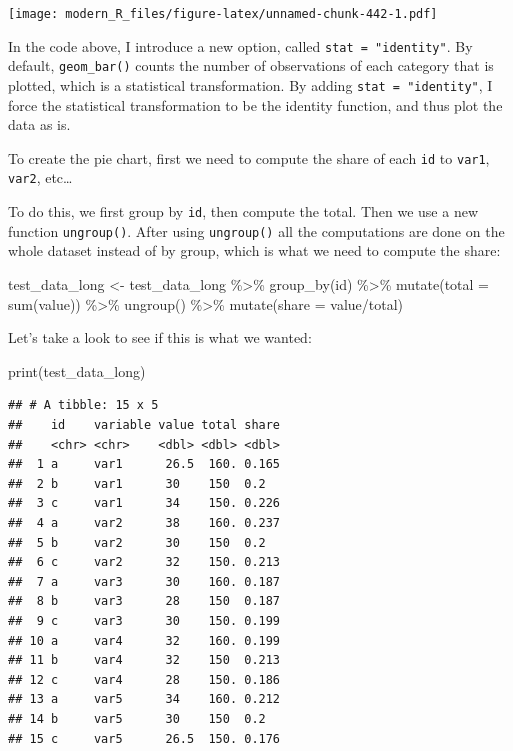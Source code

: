 \documentclass[
]{article}
\newenvironment{Shaded}{\begin{snugshade}}{\end{snugshade}}
\newcommand{\AttributeTok}[1]{\textcolor[rgb]{0.77,0.63,0.00}{#1}}
\newcommand{\FunctionTok}[1]{\textcolor[rgb]{0.00,0.00,0.00}{#1}}
\newcommand{\NormalTok}[1]{#1}
\newcommand{\OtherTok}[1]{\textcolor[rgb]{0.56,0.35,0.01}{#1}}
\newcommand{\SpecialCharTok}[1]{\textcolor[rgb]{0.00,0.00,0.00}{#1}}
\begin{document}
\texttt{[image: modern\_R\_files/figure-latex/unnamed-chunk-442-1.pdf]}

In the code above, I introduce a new option, called \texttt{stat\ =\ "identity"}. By default, \texttt{geom\_bar()} counts
the number of observations of each category that is plotted, which is a statistical transformation.
By adding \texttt{stat\ =\ "identity"}, I force the statistical transformation to be the identity function, and
thus plot the data as is.

To create the pie chart, first we need to compute the share of each \texttt{id} to \texttt{var1}, \texttt{var2}, etc\ldots{}

To do this, we first group by \texttt{id}, then compute the total. Then we use a new function \texttt{ungroup()}.
After using \texttt{ungroup()} all the computations are done on the whole dataset instead of by group, which
is what we need to compute the share:

\begin{Shaded}
\begin{Highlighting}[]
\NormalTok{test\_data\_long }\OtherTok{\textless{}{-}}\NormalTok{ test\_data\_long }\SpecialCharTok{\%\textgreater{}\%}
  \FunctionTok{group\_by}\NormalTok{(id) }\SpecialCharTok{\%\textgreater{}\%}
  \FunctionTok{mutate}\NormalTok{(}\AttributeTok{total =} \FunctionTok{sum}\NormalTok{(value)) }\SpecialCharTok{\%\textgreater{}\%}
  \FunctionTok{ungroup}\NormalTok{() }\SpecialCharTok{\%\textgreater{}\%}
  \FunctionTok{mutate}\NormalTok{(}\AttributeTok{share =}\NormalTok{ value}\SpecialCharTok{/}\NormalTok{total)}
\end{Highlighting}
\end{Shaded}

Let's take a look to see if this is what we wanted:

\begin{Shaded}
\begin{Highlighting}[]
\FunctionTok{print}\NormalTok{(test\_data\_long)}
\end{Highlighting}
\end{Shaded}

\begin{verbatim}
## # A tibble: 15 x 5
##    id    variable value total share
##    <chr> <chr>    <dbl> <dbl> <dbl>
##  1 a     var1      26.5  160. 0.165
##  2 b     var1      30    150  0.2  
##  3 c     var1      34    150. 0.226
##  4 a     var2      38    160. 0.237
##  5 b     var2      30    150  0.2  
##  6 c     var2      32    150. 0.213
##  7 a     var3      30    160. 0.187
##  8 b     var3      28    150  0.187
##  9 c     var3      30    150. 0.199
## 10 a     var4      32    160. 0.199
## 11 b     var4      32    150  0.213
## 12 c     var4      28    150. 0.186
## 13 a     var5      34    160. 0.212
## 14 b     var5      30    150  0.2  
## 15 c     var5      26.5  150. 0.176
\end{verbatim}
\end{document}
